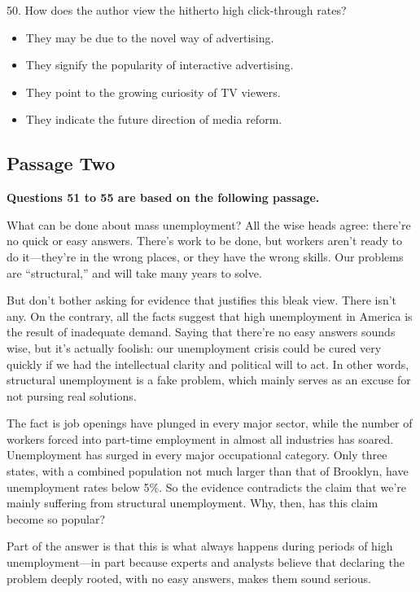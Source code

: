 \documentclass[UTF8,11pt]{ctexart}
\begin{document}
50. How does the author view the hitherto high click-through rates?


\begin{itemize}[leftmargin=2em,itemsep=.2em,topsep=.4em]\item[A.] They may be due to the novel way of advertising.
\item[B.] They signify the popularity of interactive advertising.
\item[C.] They point to the growing curiosity of TV viewers.
\item[D.] They indicate the future direction of media reform.
\end{itemize}

\subsection*{\textbf{Passage Two}}


\textbf{Questions 51 to 55 are based on the following passage.}


What can be done about mass unemployment? All the wise heads agree: there’re no quick or easy answers. There’s work to be done, but workers aren’t ready to do it—they’re in the wrong places, or they have the wrong skills. Our problems are “structural,” and will take many years to solve.


But don’t bother asking for evidence that justifies this bleak view. There isn’t any. On the contrary, all the facts suggest that high unemployment in America is the result of inadequate demand. Saying that there’re no easy answers sounds wise, but it’s actually foolish: our unemployment crisis could be cured very quickly if we had the intellectual clarity and political will to act. In other words, structural unemployment is a fake problem, which mainly serves as an excuse for not pursing real solutions.


The fact is job openings have plunged in every major sector, while the number of workers forced into part-time employment in almost all industries has soared. Unemployment has surged in every major occupational category. Only three states, with a combined population not much larger than that of Brooklyn, have unemployment rates below 5\%. So the evidence contradicts the claim that we’re mainly suffering from structural unemployment. Why, then, has this claim become so popular?


Part of the answer is that this is what always happens during periods of high unemployment—in part because experts and analysts believe that declaring the problem deeply rooted, with no easy answers, makes them sound serious.
\end{document}
